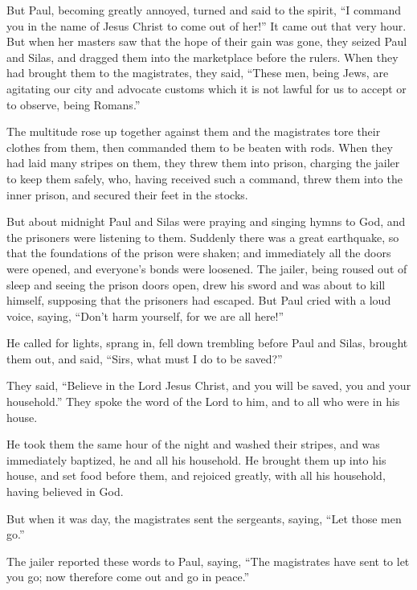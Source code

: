 {\par }{\PP But Paul, becoming greatly annoyed, turned and said to the spirit, “I command you in the name of Jesus Christ to come out of her!” It came out that very hour.
But when her masters saw that the hope of their gain was gone, they seized Paul and Silas, and dragged them into the marketplace before the rulers.
When they had brought them to the magistrates, they said, “These men, being Jews, are agitating our city
and advocate customs which it is not lawful for us to accept or to observe, being Romans.”
\par }{\PP {}The multitude rose up together against them and the magistrates tore their clothes from them, then commanded them to be beaten with rods.
When they had laid many stripes on them, they threw them into prison, charging the jailer to keep them safely,
who, having received such a command, threw them into the inner prison, and secured their feet in the stocks.
\par }{\PP {}But about midnight Paul and Silas were praying and singing hymns to God, and the prisoners were listening to them.
Suddenly there was a great earthquake, so that the foundations of the prison were shaken; and immediately all the doors were opened, and everyone’s bonds were loosened.
The jailer, being roused out of sleep and seeing the prison doors open, drew his sword and was about to kill himself, supposing that the prisoners had escaped.
But Paul cried with a loud voice, saying, “Don’t harm yourself, for we are all here!”
\par }{\PP {}He called for lights, sprang in, fell down trembling before Paul and Silas,
brought them out, and said, “Sirs, what must I do to be saved?”
\par }{\PP {}They said, “Believe in the Lord Jesus Christ, and you will be saved, you and your household.”
They spoke the word of the Lord to him, and to all who were in his house.
\par }{\PP {}He took them the same hour of the night and washed their stripes, and was immediately baptized, he and all his household.
He brought them up into his house, and set food before them, and rejoiced greatly, with all his household, having believed in God.
\par }{\PP {}But when it was day, the magistrates sent the sergeants, saying, “Let those men go.”
\par }{\PP {}The jailer reported these words to Paul, saying, “The magistrates have sent to let you go; now therefore come out and go in peace.”
}
